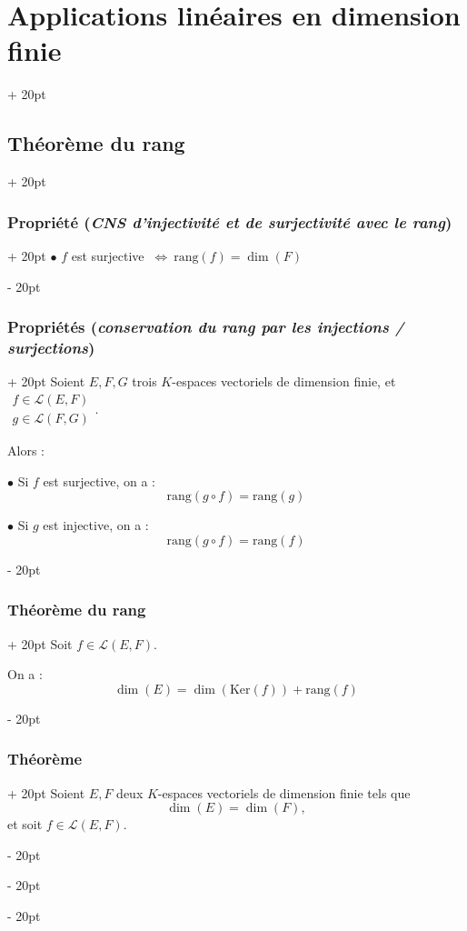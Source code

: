 \documentclass[a4paper, 12pt, twoside]{article}
\newcommand{\ssi}{\ \Leftrightarrow \ }
\newcommand{\ind}[1][20pt]{\advance\leftskip + #1}
\newcommand{\deind}[1][20pt]{\advance\leftskip - #1}
\newenvironment{indt}[2][20pt]{#2 \par \ind[#1]}{\par \deind} %
\begin{document}
\begin{indt}{\section{Applications linéaires en dimension finie}}
\begin{indt}{\subsection{Théorème du rang}}
\begin{indt}{\subsubsection{Propriété (\textit{CNS d'injectivité et de surjectivité avec le rang})}}
                $\bullet$ $f$ est surjective $\ssi \mathrm{rang}(f) = \dim(F)$
            \end{indt}

            \vspace{12pt}
            
            \begin{indt}{\subsubsection{Propriétés (\textit{conservation du rang par les injections / surjections})}}
                Soient $E, F, G$ trois $K$-espaces vectoriels de dimension finie, et
                $
                    \begin{array}{|l}
                        f \in \mathcal L(E, F)
                        \\
                        g \in \mathcal L(F, G)
                    \end{array}
                $.

                Alors :

                $\bullet$ Si $f$ est surjective, on a :
                \[
                    \mathrm{rang}(g \circ f) = \mathrm{rang}(g)
                \]

                $\bullet$ Si $g$ est injective, on a :
                \[
                    \mathrm{rang}(g \circ f) = \mathrm{rang}(f)
                \]
            \end{indt}

            \vspace{12pt}
            
            \begin{indt}{\subsubsection{Théorème du rang}}
                Soit $f \in \mathcal L(E, F)$.

                On a :
                \[
                    \dim(E) = \dim(\mathrm{Ker}(f)) + \mathrm{rang}(f)
                \]
            \end{indt}

            \vspace{12pt}
            
            \begin{indt}{\subsubsection{Théorème}}
                Soient $E, F$ deux $K$-espaces vectoriels de dimension finie tels que
                \[
                    \dim(E) = \dim(F),
                \]
                et soit $f \in \mathcal L(E, F)$.


\end{indt}
\end{indt}
\end{indt}
\end{document}
